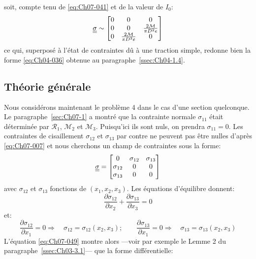 soit, compte tenu de \eqref{eq:Ch07-041} et de la valeur de $I_0$:
\begin{equation}
    \underline{\underline{\sigma}} \sim
    \begin{bmatrix}
        0 & 0 & 0 \\
        0 & 0 & \frac{2\mathcal{M}}{\pi D^2 e} \\
        0 & \frac{2\mathcal{M}}{\pi D^2 e} & 0
    \end{bmatrix}
    \label{eq:Ch07-047}
\end{equation}
ce qui, superposé à l'état de contraintes dû à une traction simple, redonne bien la forme \eqref{eq:Ch04-036} obtenue au paragraphe~\ref{ssec:Ch04-1.4}.
\subsection{Théorie générale} \label{ssec:Ch07-2.2}
Nous considérons maintenant le problème 4 dans le cas d'une section quelconque.
Le paragraphe~\ref{sec:Ch07-1} a montré que la contrainte normale $\sigma_{11}$ était déterminée par $\mathcal{R}_1$, $\mathcal{M}_2$ et $\mathcal{M}_3$.
Puisqu'ici ils sont nuls, on prendra $\sigma_{11}=0$.
Les contraintes de cisaillement $\sigma_{12}$ et $\sigma_{13}$ par contre ne peuvent pas être nulles d'après \eqref{eq:Ch07-007} et nous cherchons un champ de contraintes sous la forme:
\begin{equation}
    \underline{\underline{\sigma}} = 
    \begin{bmatrix}
        0 & \sigma_{12} & \sigma_{13} \\
        \sigma_{12} & 0 & 0\\
        \sigma_{13} & 0 & 0
    \end{bmatrix}
    \label{eq:Ch07-048}
\end{equation}
avec $\sigma_{12}$ et $\sigma_{13}$ fonctions de $\left( x_1, x_2, x_3 \right)$.
Les équations d'équilibre donnent:
\begin{equation}
    \frac{\partial \sigma_{12}}{\partial x_2} + \frac{\partial \sigma_{13}}{\partial x_3} = 0
    \label{eq:Ch07-049}
\end{equation}
et:
\begin{equation}
        \frac{\partial \sigma_{12}}{\partial x_1} = 0 \Rightarrow \quad \sigma_{12} = \sigma_{12} \left( x_2, x_3 \right); \qquad
        \frac{\partial \sigma_{13}}{\partial x_1} = 0 \Rightarrow \quad \sigma_{13} = \sigma_{13} \left( x_2, x_3 \right)
    \label{eq:Ch07-050}
\end{equation}
L'équation \eqref{eq:Ch07-049} montre alors ---voir par exemple le Lemme 2 du paragraphe~\ref{ssec:Ch03-3.1}--- que la forme différentielle:
